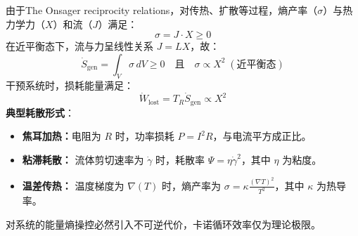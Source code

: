 \begin{thm}
\begin{add}
\begin{itemize}
    由于The Onsager reciprocity relations，对传热、扩散等过程，熵产率（\(\sigma\)）与热力学力（\(X\)）和流（\(J\)）满足：
    \[
    \sigma = J \cdot X \geq 0
    \]
在近平衡态下，流与力呈线性关系 \(J = L X\)，故：
\[
\dot{S}_{\text{gen}} = \int_V \sigma \, dV \geq 0 \quad \text{且} \quad \sigma \propto X^2 \; (\text{近平衡态})
\]
干预系统时，损耗能量满足：
\[
\dot{W}_{\text{lost}} = T_R \dot{S}_{\text{gen}} \propto X^2 
\]
\textbf{典型耗散形式}：
\begin{itemize}
\item \textbf{焦耳加热：}电阻为 \(R\) 时，功率损耗 \(P = I^2 R\)，与电流平方成正比。
\item \textbf{粘滞耗散：} 流体剪切速率为 \(\dot{\gamma}\) 时，耗散率 \( \Psi = \eta \dot{\gamma}^2 \)，其中 \(\eta\) 为粘度。
\item \textbf{温差传热：} 温度梯度为 \(\nabla(T)\) 时，熵产率为 \( \sigma = \kappa \frac{(\nabla T)^2}{T^2} \)，其中 \(\kappa\) 为热导率。
\end{itemize}
    对系统的能量\textminus 熵操控必然引入不可逆代价，卡诺循环效率仅为理论极限。
\end{itemize}
    \end{add}
\end{thm}













\ifx\allfiles\undefined

\fi
